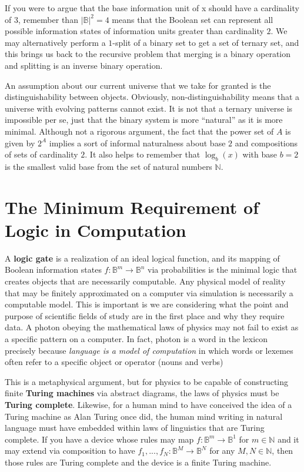 \documentclass[10pt, a5paper, twoside, openright]{memoir}
\begin{document}
If you were to argue that the base information unit of x should have a cardinality of $3$, remember than $|\mathbb B|^2 = 4$ means that the Boolean set can represent all possible information states of information units greater than cardinality $2$. We may alternatively perform a $1$-split of a binary set to get a set of ternary set, and this brings us back to the recursive problem that merging is a binary operation and splitting is an inverse binary operation.

An assumption about our current universe that we take for granted is the distinguishability between objects. Obviously, non-distinguishability means that a universe with evolving patterns cannot exist. It is not that a ternary universe is impossible per se, just that the binary system is more ``natural'' as it is more minimal. Although not a rigorous argument, the fact that the power set of $A$ is given by $2^A$ implies a sort of informal naturalness about base $2$ and compositions of sets of cardinality $2$. It also helps to remember that $\log_b (x)$ with base $b = 2$ is the smallest valid base from the set of natural numbers $\mathbb N$.

\section{The Minimum Requirement of Logic in Computation}
A \textbf{logic gate} is a realization of an ideal logical function, and its mapping of Boolean information states $f: \mathbb B^m \rightarrow \mathbb B^n$ via probabilities is the minimal logic that creates objects that are necessarily computable. Any physical model of reality that may be finitely approximated on a computer via simulation is necessarily a computable model. This is important is we are considering what the point and purpose of scientific fields of study are in the first place and why they require data. A photon obeying the mathematical laws of physics may not fail to exist as a specific pattern on a computer. In fact, photon is a word in the lexicon precisely because \textit{language is a model of computation} in which words or lexemes often refer to a specific object or operator (nouns and verbs)

This is a metaphysical argument, but for physics to be capable of constructing finite \textbf{Turing machines} via abstract diagrams, the laws of physics must be \textbf{Turing complete}. Likewise, for a human mind to have conceived the idea of a Turing machine as Alan Turing once did, the human mind writing in natural language must have embedded within laws of linguistics that are Turing complete. If you have a device whose rules may map $f: \mathbb B^m \rightarrow \mathbb B^1$ for $m \in \mathbb N$ and it may extend via composition to have $f_1 , ... , f_N: \mathbb B^M \rightarrow \mathbb B^N$ for any $M, N \in \mathbb N$, then those rules are Turing complete and the device is a finite Turing machine.
\end{document}
